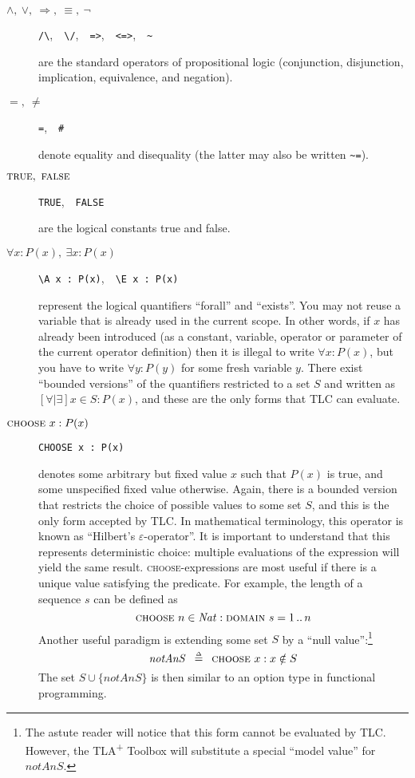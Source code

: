 \documentclass[11pt,fleqn]{article}
\newcommand{\tlaplus}{TLA\textsuperscript{+}\xspace}
\newcommand{\kw}[1]{\textnormal{\textsc{#1}}}
\newcommand{\deq}{\,\mathrel{\smash{\stackrel{\scriptscriptstyle\Delta}{=}}}\,}
\newcommand{\TRUE}{\kw{true}}
\newcommand{\FALSE}{\kw{false}}
\newcommand{\CHOOSE}{\kw{choose}}
\newcommand{\DOMAIN}{\kw{domain}}
\begin{document}
\begin{description}
\item[$\land,\ \lor,\ \Rightarrow,\ \equiv,\ \lnot$]\qquad
  \verb|/\|,\ \ \verb|\/|,\ \ \verb|=>|,\ \ \verb|<=>|,\ \ \verb|~|

  are the standard operators of propositional logic (conjunction, disjunction,
  implication, equivalence, and negation).

\item[$=,\ \neq$]\qquad \verb|=|,\ \ \verb|#|

  denote equality and disequality (the latter may also be written \verb|~=|).

\item[$\TRUE,\ \FALSE$]\qquad \verb|TRUE|,\ \ \verb|FALSE|

  are the logical constants true and false.
  
\item[$\forall x: P(x),\ \exists x: P(x)$]\qquad
  \verb|\A x : P(x)|,\ \ \verb|\E x : P(x)|

  represent the logical quantifiers ``forall'' and ``exists''. You may not
  reuse a variable that is already used in the current scope. In other words, if
  $x$ has already been introduced (as a constant, variable, operator or
  parameter of the current operator definition) then it is illegal to write
  $\forall x: P(x)$, but you have to write $\forall y: P(y)$ for some fresh
  variable $y$. There exist ``bounded versions'' of the quantifiers restricted
  to a set $S$ and written as $[\forall|\exists] x \in S: P(x)$, and these are
  the only forms that TLC can evaluate.
  
\item[$\CHOOSE\ x: P(x)$]
  \verb|CHOOSE x : P(x)|

  denotes some arbitrary but fixed value $x$ such that $P(x)$ is true, and some
  unspecified fixed value otherwise. Again, there is a bounded version that
  restricts the choice of possible values to some set $S$, and this is the only
  form accepted by TLC. In mathematical terminology, this operator is known as
  ``Hilbert's $\varepsilon$-operator''. It is important to understand that this
  represents deterministic choice: multiple evaluations of the expression will
  yield the same result. \CHOOSE{}-expressions are most useful if there is a
  unique value satisfying the predicate. For example, the length of a sequence
  $s$ can be defined as
  \[ \CHOOSE\ n \in \mathit{Nat}: \DOMAIN~s = 1\,..\,n \]
  Another useful paradigm is extending some set $S$ by a ``null
  value'':\footnote{The astute reader will notice that this form cannot be
    evaluated by TLC. However, the \tlaplus Toolbox will substitute a special
    ``model value'' for $notAnS$.}
  \[ \mathit{notAnS}\ \deq\ \CHOOSE\ x: x \notin S \]
  The set $S \cup \{notAnS\}$ is then similar to an option type in functional
  programming.
\end{description}
\end{document}
